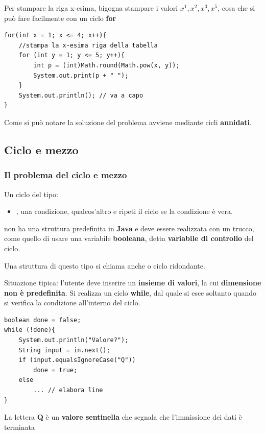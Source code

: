\begin{frame}[fragile]
\begin{block}{}
Per stampare la riga x-esima, bigogna stampare i valori \textbf{$x^1,x^2,x^3,x^5$}, cosa che si può fare facilmente con un 
ciclo \textbf{for}
\end{block}
\begin{lstlisting}
for(int x = 1; x <= 4; x++){
    //stampa la x-esima riga della tabella
    for (int y = 1; y <= 5; y++){ 
        int p = (int)Math.round(Math.pow(x, y));
        System.out.print(p + " ");
    }
    System.out.println(); // va a capo
}
\end{lstlisting}
\begin{block}{}
Come si può notare la soluzione del problema avviene mediante cicli \textbf{\alert{annidati}}.
\end{block}
\end{frame}

\subsection*{Ciclo e mezzo}
\begin{frame}
\frametitle{Il problema del ciclo e mezzo}
\begin{block}{}
Un ciclo del tipo:
\begin{itemize}
\item \textbf{}, \textbf{} una condizione, \textbf{} qualcos'altro e ripeti il ciclo
se la condizione è vera.
\end{itemize}
non ha una struttura predefinita in \textbf{Java} e deve essere realizzata con un trucco, come quello di usare una variabile
\textbf{booleana}, detta \textbf{\alert{variabile di controllo}} del ciclo.
\end{block}
\begin{block}{}
Una struttura di questo tipo si chiama anche \textbf{} o ciclo ridondante.
\end{block}
\end{frame}


\begin{frame}[fragile]
\begin{block}{}
Situazione tipica: l'utente deve inserire un \textbf{insieme di valori}, la cui \textbf{dimensione non è predefinita}. Si realizza
un ciclo \textbf{while}, dal quale si esce soltanto quando si verifica la condizione all'interno del ciclo.
\end{block}
\begin{lstlisting}
boolean done = false;
while (!done){ 
    System.out.println("Valore?");
    String input = in.next();
    if (input.equalsIgnoreCase("Q"))
        done = true;
    else
        ... // elabora line
}
\end{lstlisting}
\begin{block}
La lettera \textbf{Q} è un \textbf{\alert{valore sentinella}} che segnala che l'immissione dei dati è terminata
\end{block}
\end{frame}

